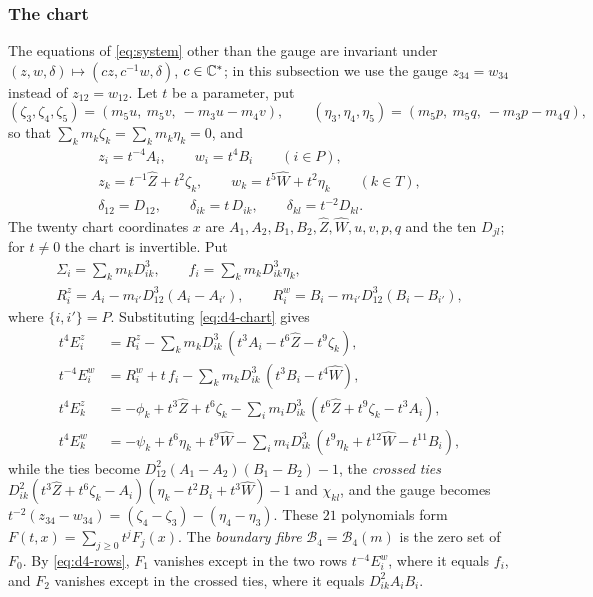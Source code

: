 \subsubsection{The chart}\label{d4-chart}
The equations of \eqref{eq:system} other than the gauge are invariant under
$(z,w,\delta)\mapsto(cz,c^{-1}w,\delta)$, $c\in\mathbb{C}^*$; in this subsection we use the gauge
$z_{34}=w_{34}$ instead of $z_{12}=w_{12}$.  Let $t$ be a parameter, put
\[
  (\zeta_3,\zeta_4,\zeta_5)=(m_5u,\ m_5v,\ -m_3u-m_4v),\qquad
  (\eta_3,\eta_4,\eta_5)=(m_5p,\ m_5q,\ -m_3p-m_4q),
\]
so that $\sum_km_k\zeta_k=\sum_km_k\eta_k=0$, and
\begin{equation}\label{eq:d4-chart}
\begin{gathered}
  z_i=t^{-4}A_i,\qquad w_i=t^{4}B_i\qquad(i\in P),\\
  z_k=t^{-1}\hat Z+t^{2}\zeta_k,\qquad w_k=t^{5}\hat W+t^{2}\eta_k\qquad(k\in T),\\
  \delta_{12}=D_{12},\qquad\delta_{ik}=t\,D_{ik},\qquad\delta_{kl}=t^{-2}D_{kl}.
\end{gathered}
\end{equation}
The twenty chart coordinates $x$ are $A_1,A_2,B_1,B_2,\hat Z,\hat W,u,v,p,q$ and the ten $D_{jl}$;
for $t\ne0$ the chart is invertible.  Put
\[
\begin{gathered}
  \Sigma_i=\sum_km_kD_{ik}^3,\qquad f_i=\sum_km_kD_{ik}^3\eta_k,\\
  R^z_i=A_i-m_{i'}D_{12}^3(A_i-A_{i'}),\qquad R^w_i=B_i-m_{i'}D_{12}^3(B_i-B_{i'}),
\end{gathered}
\]
where $\{i,i'\}=P$.  Substituting \eqref{eq:d4-chart} gives
\begin{equation}\label{eq:d4-rows}
\begin{aligned}
  t^{4}E^z_i&=R^z_i-\textstyle\sum_km_kD_{ik}^3\,(t^3A_i-t^6\hat Z-t^9\zeta_k),\\
  t^{-4}E^w_i&=R^w_i+t\,f_i-\textstyle\sum_km_kD_{ik}^3\,(t^3B_i-t^4\hat W),\\
  t^{4}E^z_k&=-\phi_k+t^3\hat Z+t^6\zeta_k-\textstyle\sum_im_iD_{ik}^3\,(t^6\hat Z+t^9\zeta_k-t^3A_i),\\
  t^{4}E^w_k&=-\psi_k+t^6\eta_k+t^9\hat W-\textstyle\sum_im_iD_{ik}^3\,(t^9\eta_k+t^{12}\hat W
  -t^{11}B_i),
\end{aligned}
\end{equation}
while the ties become $D_{12}^2(A_1-A_2)(B_1-B_2)-1$, the \emph{crossed ties}
$D_{ik}^2(t^3\hat Z+t^6\zeta_k-A_i)(\eta_k-t^2B_i+t^3\hat W)-1$ and $\chi_{kl}$, and the gauge
becomes $t^{-2}(z_{34}-w_{34})=(\zeta_4-\zeta_3)-(\eta_4-\eta_3)$.  These $21$ polynomials form
$F(t,x)=\sum_{j\ge0}t^jF_j(x)$.  The \emph{boundary fibre} $\mathcal B_4=\mathcal B_4(m)$ is the
zero set of $F_0$.  By \eqref{eq:d4-rows}, $F_1$ vanishes except in the two rows
$t^{-4}E^w_i$, where it equals $f_i$, and $F_2$ vanishes except in the crossed ties, where it
equals $D_{ik}^2A_iB_i$.

